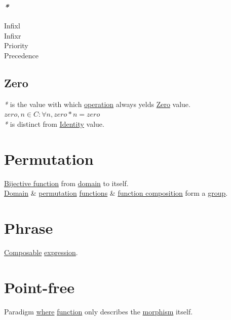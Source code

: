 \documentclass[a4paper,14pt,oneside]{book}
\begin{document}
\subsection{\emph{*}}
\label{sec:org8fdf673}

\label{org2964821}Infixl\\
\label{orgd9b47e7}Infixr\\
\label{orgae7c938}Priority\\
\label{orgbb73c40}Precedence\\

\section{\label{org298ecfc}Zero}
\label{sec:orgb943375}
\emph{*} is the value with which \hyperref[orgbac7378]{operation} always yelds \hyperref[org298ecfc]{Zero} value.\\
\(zero, n \in C : \forall n, zero*n=zero\)\\

\emph{*} is distinct from \hyperref[org5e19243]{Identity} value.\\

\chapter{\label{orgb4e1e1b}Permutation}
\label{sec:orge7369d2}
\hyperref[orgb767492]{Bijective function} from \hyperref[org0cadcd1]{domain} to itself.\\

\hyperref[org0cadcd1]{Domain} \& \hyperref[orgb4e1e1b]{permutation} \hyperref[org788d18f]{functions} \& \hyperref[org40611b4]{function composition} form a \hyperref[orgc28d1c1]{group}.\\

\chapter{\label{org84dd269}Phrase}
\label{sec:orga5af0eb}
\hyperref[orgef80547]{Composable} \hyperref[orgade06d7]{expression}.\\

\chapter{\label{orgf055eb0}Point-free}
\label{sec:org73a5709}
Paradigm \hyperref[org12b3f26]{where} \hyperref[org9530a6b]{function} only describes the \hyperref[orgc908564]{morphism} itself.\\
\end{document}
